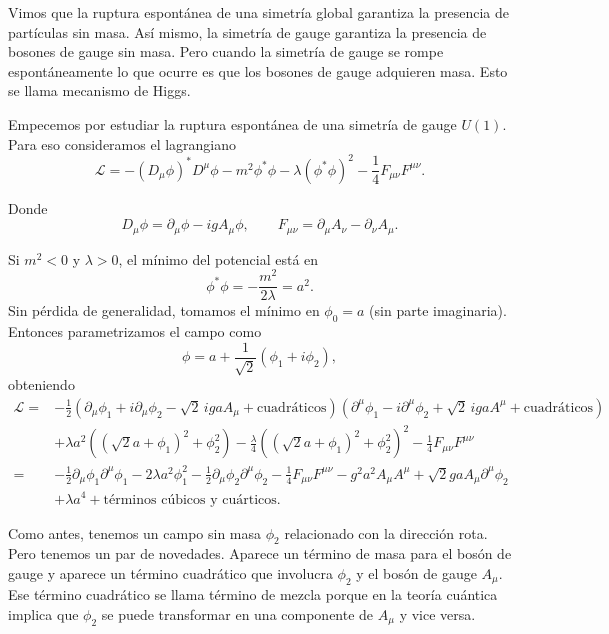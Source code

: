 \documentclass[11pt,a4paper]{article}
\begin{document}
Vimos que la ruptura espontánea de una simetría global garantiza la presencia
de partículas sin masa. Así mismo, la simetría de gauge garantiza la presencia
de bosones de gauge sin masa. Pero cuando la simetría de gauge se rompe
espontáneamente lo que ocurre es que los bosones de gauge adquieren masa. Esto
se llama mecanismo de Higgs.

Empecemos por estudiar la ruptura espontánea de una simetría de gauge $U(1)$.
Para eso consideramos el lagrangiano
\[
  \mathcal L
  =-(D_\mu\phi)^*D^\mu\phi
   -m^2\phi^*\phi
   -\lambda(\phi^*\phi)^2
   -\frac14F_{\mu\nu}F^{\mu\nu}.
\]

Donde
\[
  D_\mu\phi=\partial_\mu\phi-igA_\mu\phi,
  \qquad
  F_{\mu\nu}=\partial_\mu A_\nu-\partial_\nu A_\mu.
\]

Si $m^2<0$ y $\lambda>0$, el mínimo del potencial está en
\[
  \phi^*\phi=-\frac{m^2}{2\lambda}=a^2.
\]
Sin pérdida de generalidad, tomamos el mínimo en $\phi_0=a$ (sin parte
imaginaria). Entonces parametrizamos el campo como
\[
  \phi=a+\frac1{\sqrt2}(\phi_1+i\phi_2),
\]
obteniendo
\begin{align*}
  \mathcal L
  ={}&-\frac12
  \left(
    \partial_\mu\phi_1+i\partial_\mu\phi_2
    -\sqrt2\,igaA_\mu+\text{cuadráticos}
  \right)
  \left(
    \partial^\mu\phi_1-i\partial^\mu\phi_2
    +\sqrt2\,igaA^\mu+\text{cuadráticos}
  \right)\\
  &+\lambda a^2\left((\sqrt2a+\phi_1)^2+\phi_2^2\right)
  -\frac\lambda4\left((\sqrt2a+\phi_1)^2+\phi_2^2\right)^2
  -\frac14F_{\mu\nu}F^{\mu\nu}\\
  ={}&-\frac12\partial_\mu\phi_1\partial^\mu\phi_1
  -2\lambda a^2\phi_1^2
  -\frac12\partial_\mu\phi_2\partial^\mu\phi_2
  -\frac14F_{\mu\nu}F^{\mu\nu}
  -g^2a^2A_\mu A^\mu
  +\sqrt2gaA_\mu\partial^\mu\phi_2\\
  &+\lambda a^4+\text{términos cúbicos y cuárticos}.
\end{align*}

Como antes, tenemos un campo sin masa $\phi_2$ relacionado con la dirección
rota. Pero tenemos un par de novedades. Aparece un término de masa para el
bosón de gauge y aparece un término cuadrático que involucra $\phi_2$ y el bosón
de gauge $A_\mu$. Ese término cuadrático se llama término de mezcla porque en la
teoría cuántica implica que $\phi_2$ se puede transformar en una componente de
$A_\mu$ y vice versa.
\end{document}
